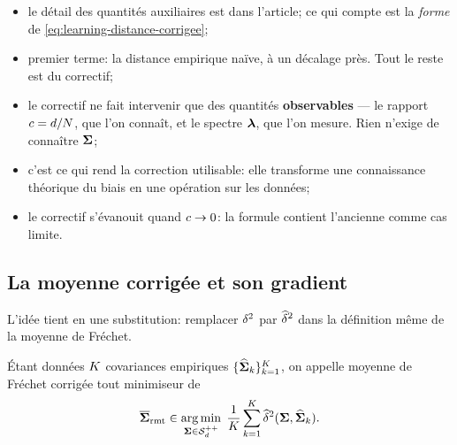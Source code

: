 \begin{remark}
\label{rem:learning-lecture-correction}
  \begin{itemize}
    \item le détail des quantités auxiliaires est dans l'article; ce qui compte
      est la \emph{forme} de \cref{eq:learning-distance-corrigee};
    \item premier terme: la distance empirique naïve, à un décalage près. Tout
      le reste est du correctif;
    \item le correctif ne fait intervenir que des quantités \textbf{observables}
      --- le rapport $c=d/N$, que l'on connaît, et le spectre
      $\boldsymbol{\lambda}$, que l'on mesure. Rien n'exige de connaître $\boldsymbol{\Sigma}$;
    \item c'est ce qui rend la correction utilisable: elle transforme une
      connaissance théorique du biais en une opération sur les données;
    \item le correctif s'évanouit quand $c\to0$: la formule contient
      l'ancienne comme cas limite.
  \end{itemize}
  \leavevmode
\end{remark}

\subsection{La moyenne corrigée et son gradient}
\label{subsec:learning-moyenne-corrigee}

L'idée tient en une substitution: remplacer $\delta^2$ par $\widehat{\delta}^2$ dans
la définition même de la moyenne de Fréchet.

\begin{definition}
\label{def:learning-frechet-rmt}
  Étant données $K$ covariances empiriques
  $\{\widehat{\boldsymbol{\Sigma}}_k\}_{k=1}^{K}$, on appelle moyenne de Fréchet corrigée
  tout minimiseur de
  \begin{equation}
    \overline{\boldsymbol{\Sigma}}_{\mathrm{rmt}}
    \in
    \operatorname*{arg\,min}_{\boldsymbol{\Sigma}\in\mathcal{S}_{d}^{++}}
    \;
    \frac{1}{K}\sum_{k=1}^{K}
    \widehat{\delta}^2(\boldsymbol{\Sigma},\widehat{\boldsymbol{\Sigma}}_k).
    \label{eq:learning-frechet-rmt}
  \end{equation}
\end{definition}

